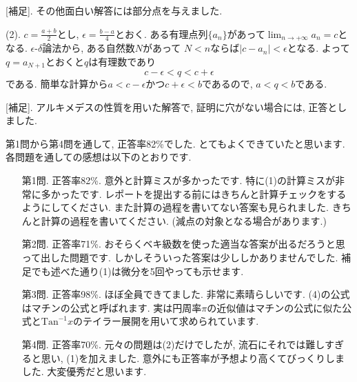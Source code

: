 \documentclass[dvipdfmx,a4paper,11pt]{article}
\newcommand{\Tan}{\text{Tan}^{-1}}
\theoremstyle{definition}
\begin{document}
[補足]. その他面白い解答には部分点を与えました.

(2).
$c=\frac{a+b}{2}$とし, $\epsilon = \frac{b-a}{4}$とおく.
ある有理点列$\{ a_n\}$があって$\lim_{n \rightarrow +\infty} a_n =c$となる.
$\epsilon$-$\delta$論法から, ある自然数$N$があって
$N <n$ならば$|c - a_n| < \epsilon$となる.
よって$q=a_{N+1}$とおくと$q$は有理数であり
$$
c-\epsilon < q < c+ \epsilon
$$
である.
簡単な計算から$a<c-\epsilon $かつ$c+\epsilon <b$であるので, $a < q < b$である.

[補足]. アルキメデスの性質を用いた解答で, 証明に穴がない場合には, 正答としました.

 \vspace{33pt} 
   
   \hspace{-11pt}{\Large 中間レポートについて.}

第1問から第4問を通して, 正答率82\%でした. とてもよくできていたと思います.
各問題を通しての感想は以下のとおりです.
\begin{itemize}
\item [第1問.] 正答率82\%. 意外と計算ミスが多かったです. 特に(1)の計算ミスが非常に多かったです.
レポートを提出する前にはきちんと計算チェックをするようにしてください. また計算の過程を書いてない答案も見られました. きちんと計算の過程を書いてください. (減点の対象となる場合があります.)
\item [第2問.] 正答率71\%. おそらくベキ級数を使った適当な答案が出るだろうと思って出した問題です. しかしそういった答案は少ししかありませんでした. 補足でも述べた通り(1)は微分を5回やっても示せます.
\item [第3問.] 正答率98\%. ほぼ全員できてました. 非常に素晴らしいです. (4)の公式はマチンの公式と呼ばれます. 実は円周率$\pi$の近似値はマチンの公式に似た公式と$\Tan x$のテイラー展開を用いて求められています. 
\item [第4問.] 正答率70\%. 元々の問題は(2)だけでしたが, 流石にそれでは難しすぎると思い, (1)を加えました. 意外にも正答率が予想より高くてびっくりしました. 大変優秀だと思います.
\end{itemize}



\end{document}
